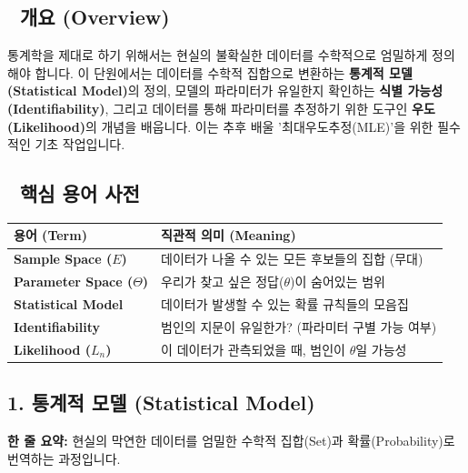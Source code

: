 \documentclass[11pt,a4paper]{book}
\theoremstyle{definition}
\begin{document}
\subsection*{📌 개요 (Overview)}
통계학을 제대로 하기 위해서는 현실의 불확실한 데이터를 수학적으로 엄밀하게 정의해야 합니다. 이 단원에서는 데이터를 수학적 집합으로 변환하는 \textbf{통계적 모델(Statistical Model)}의 정의, 모델의 파라미터가 유일한지 확인하는 \textbf{식별 가능성(Identifiability)}, 그리고 데이터를 통해 파라미터를 추정하기 위한 도구인 \textbf{우도(Likelihood)}의 개념을 배웁니다. 이는 추후 배울 '최대우도추정(MLE)'을 위한 필수적인 기초 작업입니다.

\subsection*{📝 핵심 용어 사전}
\begin{table}[h]
\centering
\begin{tabular}{|p{}|p{}|}
\hline
\textbf{용어 (Term)} & \textbf{직관적 의미 (Meaning)} \\
\hline
\textbf{Sample Space ($E$)} & 데이터가 나올 수 있는 모든 후보들의 집합 (무대) \\
\hline
\textbf{Parameter Space ($\Theta$)} & 우리가 찾고 싶은 정답($\theta$)이 숨어있는 범위 \\
\hline
\textbf{Statistical Model} & 데이터가 발생할 수 있는 확률 규칙들의 모음집 \\
\hline
\textbf{Identifiability} & 범인의 지문이 유일한가? (파라미터 구별 가능 여부) \\
\hline
\textbf{Likelihood ($L_n$)} & 이 데이터가 관측되었을 때, 범인이 $\theta$일 가능성 \\
\hline
\end{tabular}
\end{table}

\subsection{1. 통계적 모델 (Statistical Model)}

\begin{conceptbox}[title={개념 1: 통계적 모델이란 무엇인가?}]
\textbf{한 줄 요약:} 현실의 막연한 데이터를 엄밀한 수학적 집합(Set)과 확률(Probability)로 번역하는 과정입니다.
\end{conceptbox}
\end{document}
